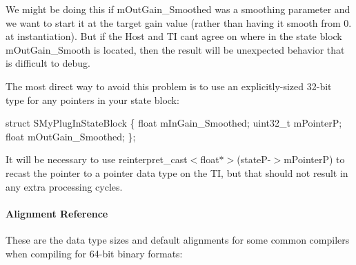 We might be doing this if {\ttfamily m\+Out\+Gain\+\_\+\+Smoothed} was a smoothing parameter and we want to start it at the target gain value (rather than having it smooth from 0. at instantiation). But if the Host and T\+I can\textquotesingle{}t agree on where in the state block m\+Out\+Gain\+\_\+\+Smooth is located, then the result will be unexpected behavior that is difficult to debug.

The most direct way to avoid this problem is to use an explicitly-\/sized 32-\/bit type for any pointers in your state block\+:


\begin{DoxyCode}
\textcolor{keyword}{struct }SMyPlugInStateBlock
\{
     \textcolor{keywordtype}{float} mInGain\_Smoothed;
     uint32\_t mPointerP;
     \textcolor{keywordtype}{float} mOutGain\_Smoothed;
\};
\end{DoxyCode}


It will be necessary to use {\ttfamily reinterpret\+\_\+cast$<$float$\ast$$>$(state\+P-\/$>$m\+Pointer\+P)} to recast the pointer to a pointer data type on the T\+I, but that should not result in any extra processing cycles.

\hypertarget{a00362_subsubsection__alignment_reference}{}\paragraph{Alignment Reference}\label{a00362_subsubsection__alignment_reference}
These are the data type sizes and default alignments for some common compilers when compiling for 64-\/bit binary formats\+:

